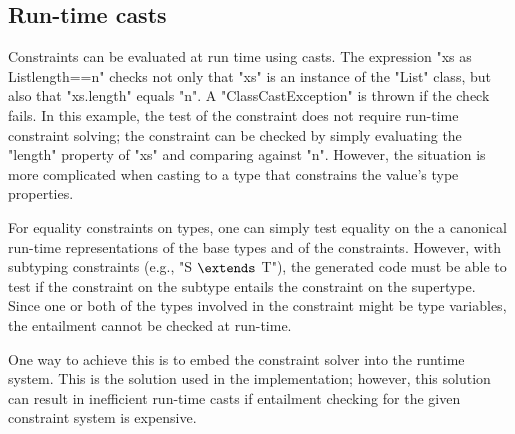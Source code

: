 \subsection{Run-time casts}

Constraints can be evaluated at run time using casts.
The expression 
\xcd"xs as List{length==n}" checks not only 
that \xcd"xs"
is an instance of
the \xcd"List" class, but also that \xcd"xs.length" equals \xcd"n".
A \xcd"ClassCastException" is thrown if the check fails.
%
In this example, the test of the constraint does not require
run-time constraint
solving; the constraint can be checked by simply
evaluating the \xcd"length" property of \xcd"xs" and comparing against \xcd"n".
However, the situation is more complicated when casting to a
type that constrains the value's type properties.

For equality constraints on types, one can simply test equality on
the a 
canonical run-time representations of the base types and of the
constraints.
However, with subtyping constraints (e.g., \xcdmath"S $\extends$ T"),
the generated code must be able to test if the constraint on the
subtype entails the constraint on the supertype.  Since one or
both of the types involved in the constraint might be type
variables, the entailment cannot be checked at run-time.

One way to achieve this is to embed
the constraint solver into the runtime system.
This is the solution used in the \Xten{} implementation; however, this
solution can result in inefficient run-time casts
if entailment checking for the given constraint system is expensive.


